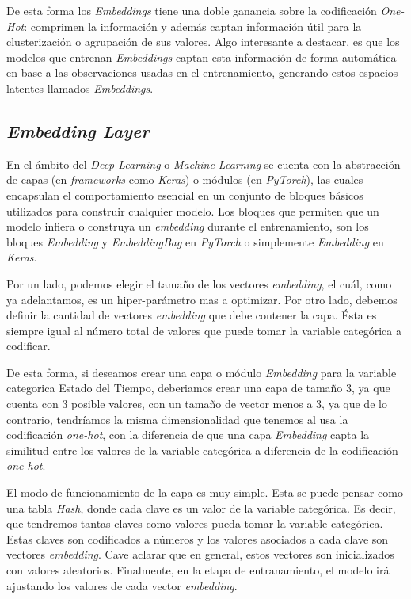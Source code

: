 \documentclass[11pt,a4paper,twoside]{thesis}
\begin{document}
De esta forma los \textit{Embeddings} tiene una doble ganancia sobre la
codificación \textit{One-Hot}: comprimen la información y además captan
información útil para la clusterización o agrupación de sus valores. Algo
interesante a destacar, es que los modelos que entrenan \textit{Embeddings}
captan esta información de forma automática en base a las observaciones usadas
en el entrenamiento, generando estos espacios latentes llamados
\textit{Embeddings}.

\subsection{\textit{Embedding Layer}}

En el ámbito del \textit{Deep Learning} o \textit{Machine Learning} se cuenta
con la abstracción de capas (en \textit{frameworks} como \textit{Keras}) o
módulos (en \textit{PyTorch}), las cuales encapsulan el comportamiento esencial
en un conjunto de bloques básicos utilizados para construir cualquier modelo.
Los bloques que permiten que un modelo infiera o construya un
\textit{embedding} durante el entrenamiento, son los bloques \textit{Embedding}
y \textit{EmbeddingBag} en \textit{PyTorch} o simplemente \textit{Embedding} en
\textit{Keras}.

Por un lado, podemos elegir el tamaño de los vectores \textit{embedding}, el
cuál, como ya adelantamos, es un hiper-parámetro mas a optimizar. Por otro
lado, debemos definir la cantidad de vectores \textit{embedding} que debe
contener la capa. Ésta es siempre igual al número total de valores que puede
tomar la variable categórica a codificar.

De esta forma, si deseamos crear una capa o módulo \textit{Embedding} para la
variable categorica Estado del Tiempo, deberiamos crear una capa de tamaño 3,
ya que cuenta con 3 posible valores, con un tamaño de vector menos a 3, ya que
de lo contrario, tendríamos la misma dimensionalidad que tenemos al usa la
codificación \textit{one-hot}, con la diferencia de que una capa
\textit{Embedding} capta la similitud entre los valores de la variable
categórica a diferencia de la codificación \textit{one-hot}.

El modo de funcionamiento de la capa es muy simple. Esta se puede pensar como
una tabla \textit{Hash}, donde cada clave es un valor de la variable
categórica. Es decir, que tendremos tantas claves como valores pueda tomar la
variable categórica. Estas claves son codificados a números y los valores
asociados a cada clave son vectores \textit{embedding}. Cave aclarar que en
general, estos vectores son inicializados con valores aleatorios. Finalmente,
en la etapa de entranamiento, el modelo irá ajustando los valores de cada
vector \textit{embedding}.
\end{document}
